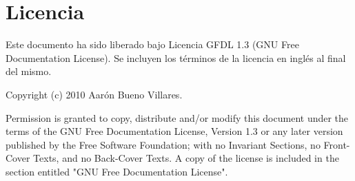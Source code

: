 %



\section*{Licencia}

Este documento ha sido liberado bajo Licencia GFDL 1.3 (GNU Free
Documentation License). Se incluyen los términos de la licencia en
inglés al final del mismo.

Copyright (c) 2010 Aarón Bueno Villares.

Permission is granted to copy, distribute and/or modify this document
under the terms of the GNU Free Documentation License, Version 1.3 or
any later version published by the Free Software Foundation; with no
Invariant Sections, no Front-Cover Texts, and no Back-Cover Texts. A
copy of the license is included in the section entitled "GNU Free
Documentation License".

